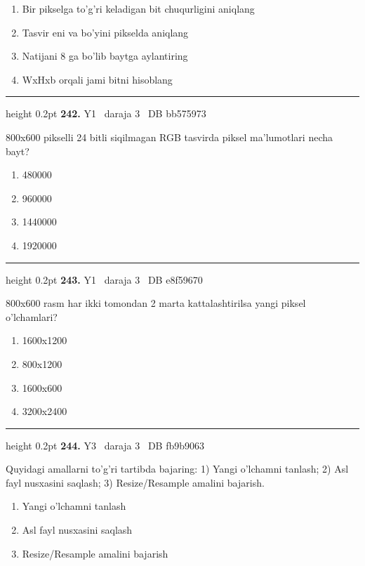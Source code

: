 \documentclass[10pt,a4paper,oneside]{article}
\begin{document}
\begin{enumerate}[label=\Alph*),leftmargin=9mm]
\item Bir pikselga to'g'ri keladigan bit chuqurligini aniqlang
\item Tasvir eni va bo'yini pikselda aniqlang
\item Natijani 8 ga bo'lib baytga aylantiring
\item WxHxb orqali jami bitni hisoblang
\end{enumerate}
\vspace{2mm}\hrule height 0.2pt \vspace{4mm}
\hypertarget{q242}{\textbf{\color{ink}242.}}  {\color{muted}\scriptsize Y1 \textbullet\ daraja 3 \textbullet\ DB bb575973}
\par
800x600 pikselli 24 bitli siqilmagan RGB tasvirda piksel ma'lumotlari necha bayt?
\begin{enumerate}[label=\Alph*),leftmargin=9mm]
\item 480000
\item 960000
\item 1440000
\item 1920000
\end{enumerate}
\vspace{2mm}\hrule height 0.2pt \vspace{4mm}
\hypertarget{q243}{\textbf{\color{ink}243.}}  {\color{muted}\scriptsize Y1 \textbullet\ daraja 3 \textbullet\ DB e8f59670}
\par
800x600 rasm har ikki tomondan 2 marta kattalashtirilsa yangi piksel o'lchamlari?
\begin{enumerate}[label=\Alph*),leftmargin=9mm]
\item 1600x1200
\item 800x1200
\item 1600x600
\item 3200x2400
\end{enumerate}
\vspace{2mm}\hrule height 0.2pt \vspace{4mm}
\hypertarget{q244}{\textbf{\color{ink}244.}}  {\color{muted}\scriptsize Y3 \textbullet\ daraja 3 \textbullet\ DB fb9b9063}
\par
Quyidagi amallarni to'g'ri tartibda bajaring: 1) Yangi o'lchamni tanlash; 2) Asl fayl nusxasini saqlash; 3) Resize/Resample amalini bajarish.
\begin{enumerate}[label=\Alph*),leftmargin=9mm]
\item Yangi o'lchamni tanlash
\item Asl fayl nusxasini saqlash
\item Resize/Resample amalini bajarish
\end{enumerate}
\end{document}
